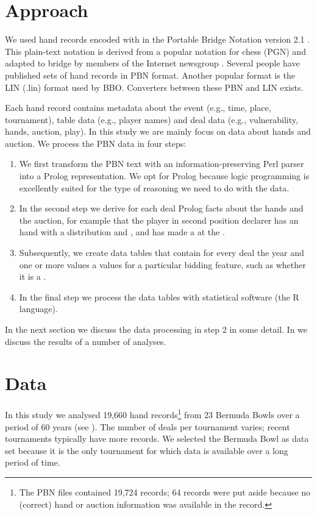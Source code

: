 \documentclass{llncs}
\begin{document}
\section{Approach}
\label{sec:approach}

We used hand records encoded with in the Portable Bridge Notation
version 2.1 \cite{pbn21}. This plain-text notation is derived from a popular
notation for chess (PGN) and adapted to bridge by members of the
Internet newsgroup . Several people have
published sets of hand records in PBN format. Another popular format
is the LIN (.lin) format used by BBO. Converters between these PBN and
LIN exists.   

Each hand record contains metadata about the event (e.g., time, place,
tournament), table data (e.g., player names) and deal data (e.g.,
vulnerability, hands, auction, play).  In this study we are mainly
focus on data about hands and auction. We process the PBN data in
four steps:

\begin{enumerate}
\item We first transform the PBN
text with an information-preserving Perl parser into a Prolog
representation. We opt for Prolog because logic programming is
excellently suited for the type of reasoning we need to do with the
data. 
\item In the second step we derive for each deal Prolog facts about
the hands and the auction, for example that the player in second
position declarer has an 
hand with a  distribution and , and has made a
 at the . 
\item Subsequently, we create data tables that contain for every deal
the year and one or more values a values for a particular bidding
feature, such as whether it is a .   
\item In the final step we process the data tables with statistical
software (the R language). 
\end{enumerate}

In the next section we discuss the data processing in step 2 in some
detail. In  we discuss the results of a number of
analyses.  

\section{Data}
\label{sec:data}

In this study we analysed 19,660 hand records\footnote{%
The PBN files contained 19,724 records; 64 records were put aside
because no (correct) hand or auction information was available in the record.}
from 23 Bermuda Bowls
over a period of 60 years (see ).  The number of deals per
tournament varies; recent tournaments typically have more records.  We
selected the Bermuda Bowl as data set because it
is the only tournament for which data is available over a long period
of time.   
\end{document}
